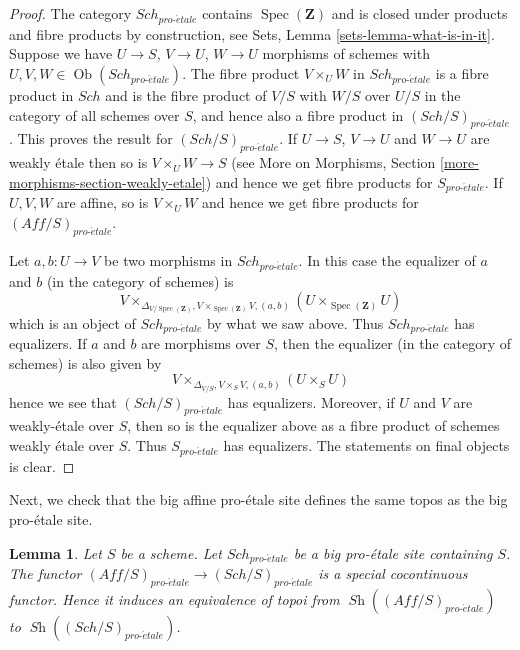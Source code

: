 \documentclass{stacks-project}
\theoremstyle{plain}
\newtheorem{lemma}[subsection]{Lemma}
\theoremstyle{definition}
\theoremstyle{remark}
\numberwithin{equation}{subsection}
\def\Spec{\mathop{\mathrm{Spec}}}
\def\Sch{\mathit{Sch}}
\def\Ob{\mathop{\mathrm{Ob}}\nolimits}
\def\Sh{\mathop{\mathit{Sh}}\nolimits}
\def\proetale{{pro\text{-}\acute{e}tale}}
\begin{document}
\begin{proof}
The category $\Sch_\proetale$ contains $\Spec(\mathbf{Z})$ and
is closed under products and fibre products by construction, see
Sets, Lemma \ref{sets-lemma-what-is-in-it}.
Suppose we have $U \to S$, $V \to U$, $W \to U$ morphisms
of schemes with $U, V, W \in \Ob(\Sch_\proetale)$.
The fibre product $V \times_U W$ in $\Sch_\proetale$
is a fibre product in $\Sch$ and
is the fibre product of $V/S$ with $W/S$ over $U/S$ in
the category of all schemes over $S$, and hence also a
fibre product in $(\Sch/S)_\proetale$.
This proves the result for $(\Sch/S)_\proetale$.
If $U \to S$, $V \to U$ and $W \to U$ are weakly \'etale then so is
$V \times_U W \to S$ (see
More on Morphisms, Section \ref{more-morphisms-section-weakly-etale})
and hence we get fibre products for $S_\proetale$.
If $U, V, W$ are affine, so is $V \times_U W$ and hence we
get fibre products for $(\textit{Aff}/S)_\proetale$.

\medskip\noindent
Let $a, b : U \to V$ be two morphisms in $\Sch_\proetale$.
In this case the equalizer of $a$ and $b$ (in the category of schemes) is
$$
V
\times_{\Delta_{V/\Spec(\mathbf{Z})}, V \times_{\Spec(\mathbf{Z})} V, (a, b)}
(U \times_{\Spec(\mathbf{Z})} U)
$$
which is an object of $\Sch_\proetale$ by what we saw above.
Thus $\Sch_\proetale$ has equalizers. If $a$ and $b$ are morphisms over $S$,
then the equalizer (in the category of schemes) is also given by
$$
V \times_{\Delta_{V/S}, V \times_S V, (a, b)} (U \times_S U)
$$
hence we see that $(\Sch/S)_\proetale$ has equalizers. Moreover, if
$U$ and $V$ are weakly-\'etale over $S$, then so is the equalizer
above as a fibre product of schemes weakly \'etale over $S$.
Thus $S_\proetale$ has equalizers. The statements on final objects
is clear.
\end{proof}

\noindent
Next, we check that the big affine pro-\'etale site defines the same
topos as the big pro-\'etale site.

\begin{lemma}
\label{lemma-affine-big-site-proetale}
Let $S$ be a scheme. Let $\Sch_\proetale$ be a big pro-\'etale
site containing $S$.
The functor $(\textit{Aff}/S)_\proetale \to (\Sch/S)_\proetale$
is a special cocontinuous functor. Hence it induces an equivalence
of topoi from $\Sh((\textit{Aff}/S)_\proetale)$ to
$\Sh((\Sch/S)_\proetale)$.
\end{lemma}
\end{document}
